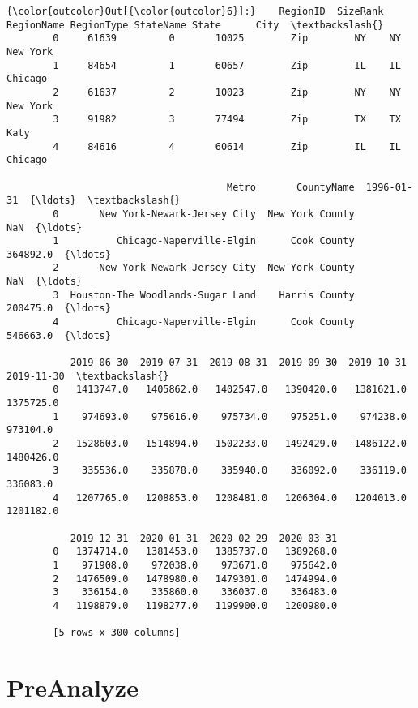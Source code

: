 \documentclass[11pt]{article}
\begin{document}
\begin{Verbatim}[commandchars=\\\{\}]
{\color{outcolor}Out[{\color{outcolor}6}]:}    RegionID  SizeRank  RegionName RegionType StateName State      City  \textbackslash{}
        0     61639         0       10025        Zip        NY    NY  New York   
        1     84654         1       60657        Zip        IL    IL   Chicago   
        2     61637         2       10023        Zip        NY    NY  New York   
        3     91982         3       77494        Zip        TX    TX      Katy   
        4     84616         4       60614        Zip        IL    IL   Chicago   
        
                                      Metro       CountyName  1996-01-31  {\ldots}  \textbackslash{}
        0       New York-Newark-Jersey City  New York County         NaN  {\ldots}   
        1          Chicago-Naperville-Elgin      Cook County    364892.0  {\ldots}   
        2       New York-Newark-Jersey City  New York County         NaN  {\ldots}   
        3  Houston-The Woodlands-Sugar Land    Harris County    200475.0  {\ldots}   
        4          Chicago-Naperville-Elgin      Cook County    546663.0  {\ldots}   
        
           2019-06-30  2019-07-31  2019-08-31  2019-09-30  2019-10-31  2019-11-30  \textbackslash{}
        0   1413747.0   1405862.0   1402547.0   1390420.0   1381621.0   1375725.0   
        1    974693.0    975616.0    975734.0    975251.0    974238.0    973104.0   
        2   1528603.0   1514894.0   1502233.0   1492429.0   1486122.0   1480426.0   
        3    335536.0    335878.0    335940.0    336092.0    336119.0    336083.0   
        4   1207765.0   1208853.0   1208481.0   1206304.0   1204013.0   1201182.0   
        
           2019-12-31  2020-01-31  2020-02-29  2020-03-31  
        0   1374714.0   1381453.0   1385737.0   1389268.0  
        1    971908.0    972038.0    973671.0    975642.0  
        2   1476509.0   1478980.0   1479301.0   1474994.0  
        3    336154.0    335860.0    336037.0    336483.0  
        4   1198879.0   1198277.0   1199900.0   1200980.0  
        
        [5 rows x 300 columns]
\end{Verbatim}
            
    \section{PreAnalyze}\label{preanalyze}
\end{document}
